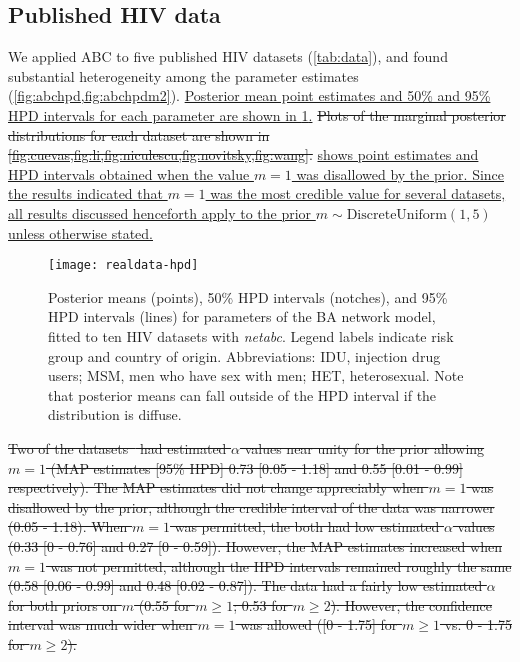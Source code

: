 \documentclass[12pt]{article}\usepackage[]{graphicx}\usepackage[]{color}
\let\mref\cref
\let\Mref\Cref
\renewcommand{\cref}[1]{\mbox{\mref{#1}}}
\renewcommand{\Cref}[1]{\mbox{\Mref{#1}}}
\newcommand{\add}[1]{\color{blue} \uline{#1} \color{black}}
\newcommand{\del}[1]{\color{red} \sout{#1} \color{black}}
\begin{document}
\subsection*{Published HIV data}



We applied ABC to five published HIV datasets (\cref{tab:data}),
and found substantial heterogeneity among the parameter estimates
(\cref{fig:abchpd,fig:abchpdm2}). \add{Posterior mean point estimates and 50\%
and 95\% HPD intervals for each parameter are shown in \cref{fig:abchpd}.}
\del{Plots of the marginal posterior distributions for each dataset are shown
in \cref{fig:cuevas,fig:li,fig:niculescu,fig:novitsky,fig:wang}.}
\add{ shows point estimates and HPD intervals obtained when
the value $m = 1$ was disallowed by the prior. Since the results indicated that
$m = 1$ was the most credible value for several datasets, all results discussed
henceforth apply to the prior $m \sim \text{DiscreteUniform}(1, 5)$ unless
otherwise stated.}

\begin{figure}[ht]
    \centering
    \texttt{[image: realdata-hpd]}
    \caption[
        Posterior means and 50\%/95\% HPD intervals for parameters of the
        BA network model, fitted to ten HIV datasets with \textit{netabc}.
    ]{
        Posterior means (points), 50\% HPD intervals (notches), and 95\%
        HPD intervals (lines) for parameters of the BA network model, fitted to
        ten HIV datasets with \textit{netabc}. Legend labels indicate risk
        group and country of origin. Abbreviations: IDU, injection drug users;
        MSM, men who have sex with men; HET, heterosexual. Note that posterior
        means can fall outside of the HPD interval if the distribution is
        diffuse.
    }
    \label{fig:abchpd}
\end{figure}

\del{Two of the datasets~\autocite{niculescu2015recent, wang2015targeting} had
estimated $\alpha$ values near unity for the prior allowing $m = 1$ (MAP
estimates [95\% HPD] 
  0.73 
  [0.05 - 
   1.18]
and
  0.55 
  [0.01 -
   0.99] respectively).
The MAP estimates did not change appreciably when $m = 1$ was disallowed by the
prior, although the credible interval of the \textcite{niculescu2015recent}
data was narrower
  (0.05 - 
   1.18).
When $m = 1$ was permitted, the \textcite{li2015hiv, cuevas2009hiv} both had
low estimated $\alpha$ values
  (0.33 
  [0 - 
  0.76]
and
  0.27 
  [0 -
   0.59]). 
However, the MAP estimates increased when $m = 1$ was not permitted, although
the HPD intervals remained roughly the same
  (0.58 
  [0.06 - 
  0.99]
and
  0.48 
  [0.02 -
   0.87]).
The \textcite{novitsky2014impact} data had a fairly low estimated $\alpha$
for both priors on $m$
  (0.55 for $m \geq 1$;
   0.53 for $m \geq 2$).
However, the confidence interval was much wider when $m = 1$ was allowed
  ([0 -
    1.75] for $m \geq 1$ vs.
    0 -
    1.75 for $m \geq 2$).}
\end{document}
